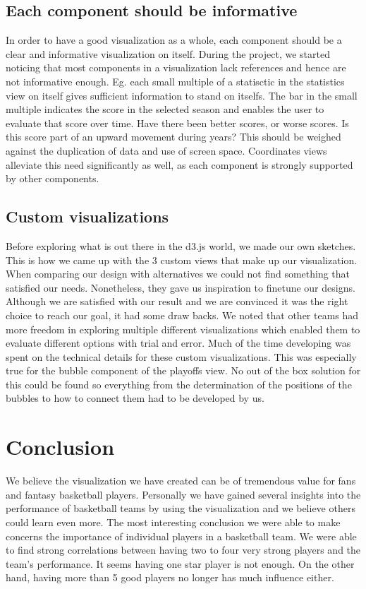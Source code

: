 \documentclass[chi_draft]{sigchi}
\begin{document}
\subsection{Each component should be informative}
In order to have a good visualization as a whole, each component should be a
clear and informative visualization on itself. During the project, we started noticing that most
components in a visualization lack references and hence are not informative
enough. Eg. each small multiple of a statisctic in the statistics view on itself
gives sufficient information to stand on itselfs. The bar in the small multiple
indicates the score in the selected season and enables the user to evaluate that
score over time. Have there been better scores, or worse scores. Is this score
part of an upward movement during years? This should be weighed against the
duplication of data and use of screen space. Coordinates views alleviate this
need significantly as well, as each component is strongly supported by other
components.

\subsection{Custom visualizations}
Before exploring what is out there in the d3.js world, we made our own sketches.
This is how we came up with the 3 custom views that make up our visualization.
When comparing our design with alternatives we could not find something that
satisfied our needs. Nonetheless, they gave us inspiration to finetune our
designs. Although we are satisfied with our result and we are convinced it was
the right choice to reach our goal, it had some draw backs. We noted that other
teams had more freedom in exploring multiple different visualizations which
enabled them to evaluate different options with trial and error. Much of the
time developing was spent on the technical details for these custom
visualizations. This was especially true for the bubble component of the
playoffs view. No out of the box solution for this could be found so everything
from the determination of the positions of the bubbles to how to connect them
had to be developed by us.

\section{Conclusion}\label{sec:conclusion}
We believe the visualization we have created can be of tremendous value for fans
and fantasy basketball players. Personally we have gained several insights into
the performance of basketball teams by using the visualization and we believe
others could learn even more. 
The most interesting conclusion we were able to make concerns the importance of
individual players in a basketball team. We were able to find strong
correlations between having two to four very strong players and the team's
performance. It seems having one star player is not enough. On the other hand,
having more than 5 good players no longer has much influence either. 
\end{document}
